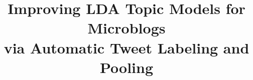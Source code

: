 \documentclass{sig-alternate}
\begin{document}
%

\title{Improving LDA Topic Models for Microblogs\\ via Automatic Tweet Labeling and Pooling}
%
%
%
%
%
\end{document}
